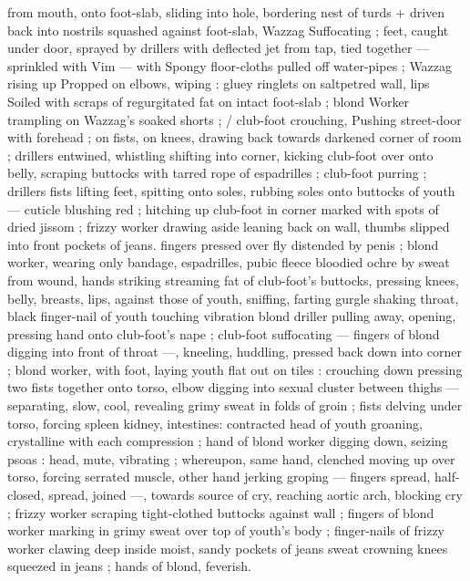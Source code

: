 from mouth, onto foot-slab, sliding into hole, bordering nest of turds 
+ driven back into nostrils squashed against foot-slab, Wazzag 
Suffocating ; feet, caught under door, sprayed by drillers with 
deflected jet from tap, tied together --- sprinkled with Vim --- with 
Spongy floor-cloths pulled off water-pipes ; Wazzag rising up 
Propped on elbows, wiping : gluey ringlets on saltpetred wall, lips 
Soiled with scraps of regurgitated fat on intact foot-slab ; blond 
Worker trampling on Wazzag's soaked shorts ; {\slash} club-foot crouching, 
Pushing street-door with forehead ; on fists, on knees, drawing back 
towards darkened corner of room ; drillers entwined, whistling 
shifting into corner, kicking club-foot over onto belly, scraping 
buttocks with tarred rope of espadrilles ; club-foot purring ; drillers 
fists lifting feet, spitting onto soles, rubbing soles onto buttocks of 
youth --- cuticle blushing red ; hitching up club-foot in corner 
marked with spots of dried jissom ; frizzy worker drawing aside 
leaning back on wall, thumbs slipped into front pockets of jeans. 
fingers pressed over fly distended by penis ; blond worker, wearing 
only bandage, espadrilles, pubic fleece bloodied ochre by sweat from 
wound, hands striking streaming fat of club-foot's buttocks, pressing 
knees, belly, breasts, lips, against those of youth, sniffing, farting 
gurgle shaking throat, black finger-nail of youth touching vibration 
blond driller pulling away, opening, pressing hand onto club-foot's 
nape ; club-foot suffocating --- fingers of blond digging into front of 
throat ---, kneeling, huddling, pressed back down into corner ; blond 
worker, with foot, laying youth flat out on tiles : crouching down 
pressing two fists together onto torso, elbow digging into sexual 
cluster between thighs --- separating, slow, cool, revealing grimy 
sweat in folds of groin ; fists delving under torso, forcing spleen 
kidney, intestines: contracted head of youth groaning, crystalline 
with each compression ; hand of blond worker digging down, seizing 
psoas : head, mute, vibrating ; whereupon, same hand, clenched 
moving up over torso, forcing serrated muscle, other hand jerking 
groping --- fingers spread, half-closed, spread, joined ---, towards 
source of cry, reaching aortic arch, blocking cry ; frizzy worker 
scraping tight-clothed buttocks against wall ; fingers of blond worker 
marking in grimy sweat over top of youth's body ; finger-nails of 
frizzy worker clawing deep inside moist, sandy pockets of jeans 
sweat crowning knees squeezed in jeans ; hands of blond, feverish. 
